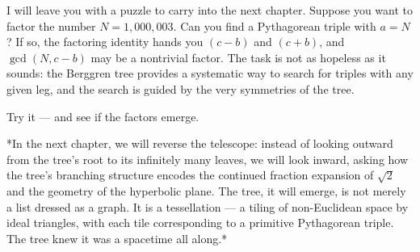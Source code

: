 I will leave you with a puzzle to carry into the next chapter. Suppose you want to factor the number $N = 1{,}000{,}003$. Can you find a Pythagorean triple with $a = N$? If so, the factoring identity hands you $(c - b)$ and $(c + b)$, and $\gcd(N, c - b)$ may be a nontrivial factor. The task is not as hopeless as it sounds: the Berggren tree provides a systematic way to search for triples with any given leg, and the search is guided by the very symmetries of the tree.

Try it --- and see if the factors emerge.


\ornbreak


*In the next chapter, we will reverse the telescope: instead of looking outward from the tree's root to its infinitely many leaves, we will look inward, asking how the tree's branching structure encodes the continued fraction expansion of $\sqrt{2}$ and the geometry of the hyperbolic plane. The tree, it will emerge, is not merely a list dressed as a graph. It is a tessellation --- a tiling of non-Euclidean space by ideal triangles, with each tile corresponding to a primitive Pythagorean triple. The tree knew it was a spacetime all along.*

